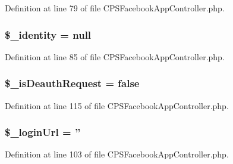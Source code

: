 Definition at line 79 of file CPSFacebookAppController.php.

\hypertarget{classCPSFacebookAppController_a5584acee1fc0d8fbc8970705ce8795cf}{
\subsubsection[{\$\_\-identity}]{\setlength{\rightskip}{0pt plus 5cm}\$\_\-identity = null}}
\label{classCPSFacebookAppController_a5584acee1fc0d8fbc8970705ce8795cf}


Definition at line 85 of file CPSFacebookAppController.php.

\hypertarget{classCPSFacebookAppController_a0363ec28009b511c07f346dd1b889afb}{
\subsubsection[{\$\_\-isDeauthRequest}]{\setlength{\rightskip}{0pt plus 5cm}\$\_\-isDeauthRequest = false}}
\label{classCPSFacebookAppController_a0363ec28009b511c07f346dd1b889afb}


Definition at line 115 of file CPSFacebookAppController.php.

\hypertarget{classCPSFacebookAppController_ad0039d9d92917bd2c7e46c93d8562b8b}{
\subsubsection[{\$\_\-loginUrl}]{\setlength{\rightskip}{0pt plus 5cm}\$\_\-loginUrl = ''}}
\label{classCPSFacebookAppController_ad0039d9d92917bd2c7e46c93d8562b8b}


Definition at line 103 of file CPSFacebookAppController.php.

